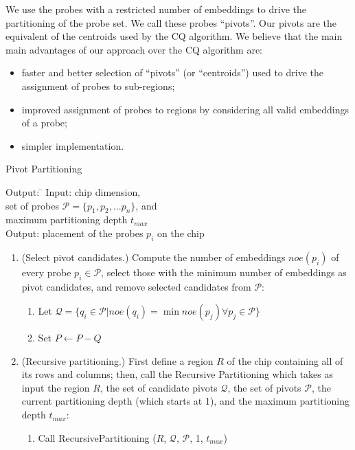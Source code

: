 \documentclass{llncs}
\begin{document}
We use the probes with a restricted number of embeddings to drive the partitioning
of the probe set. We call these probes ``pivots''. Our pivots are the equivalent of the
centroids used by the CQ algorithm. We believe that the main main advantages of our
approach over the CQ algorithm are:

\begin{itemize}
\item faster and better selection of ``pivots'' (or ``centroids'') used to drive
the assignment of probes to sub-regions;
\item improved assignment of probes to regions by considering all valid embeddings
of a probe;
\item simpler implementation.
\end{itemize}

\begin{algorithm}
\caption{Pivot Partitioning}
\label{alg:pivotpart}
\begin{minipage}{4.8in}

\begin{tabbing}
Output: \=									\kill
Input:  \> chip dimension,							\\
        \> set of probes $\mathcal{P} = \{p_{1}, p_{2}, ... p_{n}\}$, and	\\
        \> maximum partitioning depth $t_{max}$					\\
Output: \> placement of the probes $p_i$ on the chip
\end{tabbing}

\begin{enumerate}
\item (Select pivot candidates.) Compute the number of embeddings $noe(p_i)$
of every probe $p_i \in \mathcal{P}$, select those with the minimum number
of embeddings as pivot candidates, and remove selected candidates from
$\mathcal{P}$:
  \begin{enumerate}
  \item Let $\mathcal{Q} = \{q_i \in \mathcal{P} | noe(q_i) = \min noe(p_j) \forall p_j \in \mathcal{P} \}$
  \item Set $P \leftarrow P - Q$
  \end{enumerate}
\item (Recursive partitioning.) First define a region $R$ of the chip containing
all of its rows and columns; then, call the Recursive Partitioning which takes as
input the region $R$, the set of candidate pivots $\mathcal{Q}$, the set of pivots
$\mathcal{P}$, the current partitioning depth (which starts at 1), and the
maximum partitioning depth $t_{max}$:
  \begin{enumerate}
  \item Call RecursivePartitioning ($R$, $\mathcal{Q}$, $\mathcal{P}$, 1, $t_{max}$)
  \end{enumerate}
\end{enumerate}

\end{minipage}
\end{algorithm}
\end{document}
